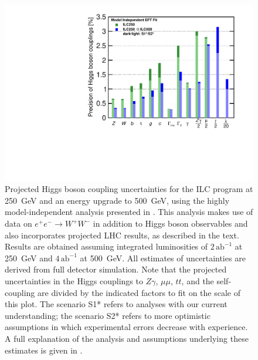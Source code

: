 \documentclass[%
 reprint,
 amsmath,amssymb,
 aps,
]{revtex4-1}
\def\ee{e^+e^-}
\begin{document}
\begin{figure}
\begin{center}
\includegraphics[width=0.99\hsize]{figures/ModelindepSummary.pdf}
\caption{Projected Higgs boson coupling uncertainties for the ILC
  program at 250~GeV and an energy upgrade to 500~GeV, using the
  highly model-independent analysis presented in \cite{Barklow:2017suo}. This  analysis makes use of  data on $\ee\to W^+W^-$ in addition to Higgs boson observables and also incorporates projected LHC results, as described  in the text. Results are obtained assuming integrated luminosities of $2\,{\mathrm{ab}}^{-1}$ at 250~GeV and $4\,{\mathrm{ab}}^{-1}$ at 500~GeV. All estimates of uncertainties are derived from full detector simulation. Note that the projected uncertainties in the Higgs couplings to $Z\gamma$, $\mu\mu$, $tt$, and the self-coupling are divided by the indicated factors to fit on the scale of this plot. The scenario S1* refers to analyses with our current understanding; the scenario S2* refers to more optimistic assumptions in which experimental errors decrease with experience.   A full explanation of the analysis and assumptions underlying these estimates is given in \cite{ILCforESS}.}
\label{fig:ILCmodelindep}
\end{center}
\vspace{-0.7cm}
\end{figure}
\end{document}
